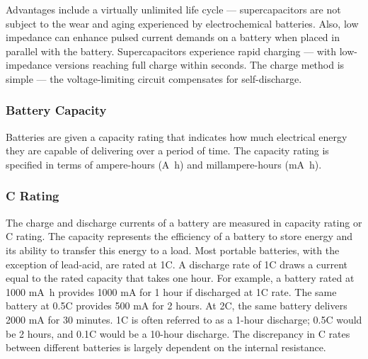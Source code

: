 \documentclass[../../document]{subfiles}
\begin{document}
Advantages include a virtually unlimited life cycle --- supercapacitors are not
subject to the wear and aging experienced by electrochemical batteries. Also,
low impedance can enhance pulsed current demands on a battery when placed in
parallel with the battery. Supercapacitors experience rapid charging --- with
low-impedance versions reaching full charge within seconds. The charge method
is simple --- the voltage-limiting circuit compensates for self-discharge.
\cite{practical_electronics}

\subsubsection{Battery Capacity}
Batteries are given a capacity rating that indicates how much electrical energy
they are capable of delivering over a period of time. The capacity rating is
specified in terms of ampere-hours (\unit{\ampere\hour}) and millampere-hours
(\unit{\milli\ampere\hour}). \cite{practical_electronics}

\subsubsection{C Rating}
The charge and discharge currents of a battery are measured in capacity rating
or C rating. The capacity represents the efficiency of a battery to store
energy and its ability to transfer this energy to a load. Most portable
batteries, with the exception of lead-acid, are rated at 1C. A discharge rate
of 1C draws a current equal to the rated capacity that takes one hour. For
example, a battery rated at 1000 \unit{\milli\ampere\hour} provides 1000
\unit{\milli\ampere} for 1 hour if discharged at 1C rate. The same battery at
0.5C provides 500 \unit{\milli\ampere} for 2 hours. At 2C, the same battery
delivers 2000 \unit{\milli\ampere} for 30 minutes. 1C is often referred to as a
1-hour discharge; 0.5C would be 2 hours, and 0.1C would be a 10-hour discharge.
The discrepancy in C rates between different batteries is largely dependent on
the internal resistance. \cite{practical_electronics}
\end{document}
